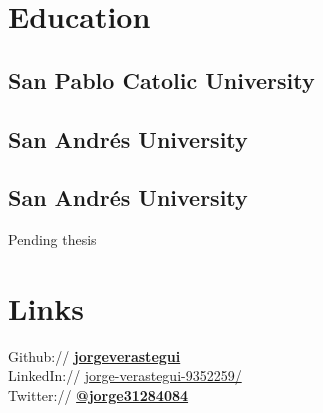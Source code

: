 \documentclass[]{jorge-resume-openfont}
\begin{document}
%
%
\lastupdated

%
%

%
%

\begin{minipage}[t]{0.33\textwidth} 


\section{Education} 

\subsection{San Pablo Catolic University}
\sectionsep

\subsection{San Andrés University}
\sectionsep

\subsection{San Andrés University}
Pending thesis 
\sectionsep


\section{Links} 
Github:// \href{https://github.com/jorgeverastegui}{\bf jorgeverastegui} \\
LinkedIn:// \href{https://www.linkedin.com/in/jorge-verastegui-9352259/}{jorge-verastegui-9352259/}\\
Twitter://  \href{https://twitter.com/jorge31284084}{\bf @jorge31284084} \\




\end{minipage}
\end{document}
